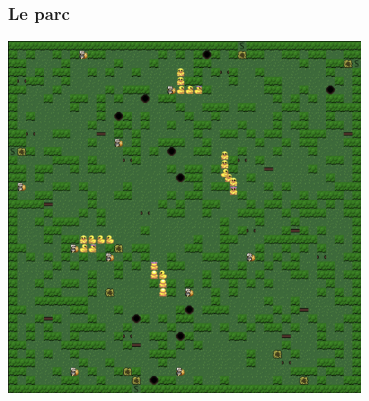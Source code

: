 \documentclass[table]{beamer}
\begin{document}
\begin{frame}
    \frametitle{Le parc}
    \begin{center}
        \includegraphics[width=0.7\textwidth]{img/map} 
    \end{center}
\end{frame}
\end{document}
